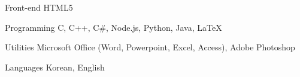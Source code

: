 

\begin{cvskills}



  \cvskill
    {Front-end} %
    {HTML5} %

  \cvskill
    {Programming} %
    {C, C++, C\#, Node.js, Python, Java, LaTeX} %


  \cvskill
    {Utilities} %
    {Microsoft Office (Word, Powerpoint, Excel, Access), Adobe Photoshop} %

  \cvskill
    {Languages} %
    {Korean, English} %

\end{cvskills}
